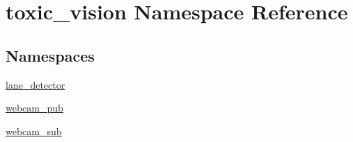 \hypertarget{namespacetoxic__vision}{}\section{toxic\+\_\+vision Namespace Reference}
\label{namespacetoxic__vision}
\subsection*{Namespaces}
\begin{DoxyCompactItemize}
\item 
 \mbox{\hyperlink{namespacetoxic__vision_1_1lane__detector}{lane\+\_\+detector}}
\item 
 \mbox{\hyperlink{namespacetoxic__vision_1_1webcam__pub}{webcam\+\_\+pub}}
\item 
 \mbox{\hyperlink{namespacetoxic__vision_1_1webcam__sub}{webcam\+\_\+sub}}
\end{DoxyCompactItemize}
